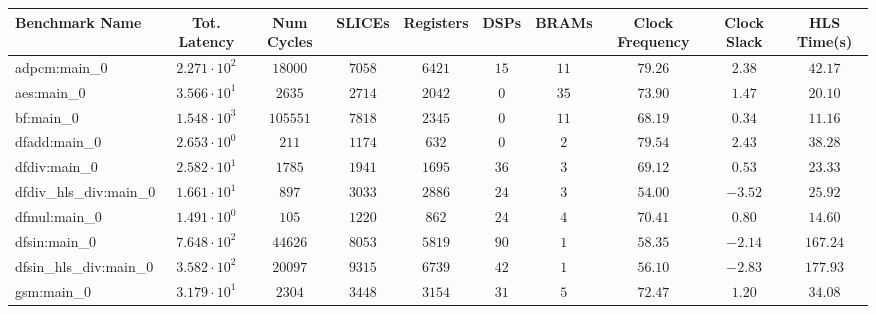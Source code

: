 \begin{tabular}{|l|c|c|c|c|c|c|c|c|c|}
\hline
Benchmark Name          & Tot. Latency           & Num Cycles & SLICEs    & Registers & DSPs    & BRAMs   & Clock Frequency & Clock Slack & HLS Time(s) \\
\hline
adpcm:main\_0           & $ 2.271 \cdot 10^{2} $ & $ 18000  $ & $ 7058  $ & $ 6421  $ & $ 15  $ & $ 11  $ & $ 79.26       $ & $ 2.38    $ & $ 42.17   $ \\
aes:main\_0             & $ 3.566 \cdot 10^{1} $ & $ 2635   $ & $ 2714  $ & $ 2042  $ & $ 0   $ & $ 35  $ & $ 73.90       $ & $ 1.47    $ & $ 20.10   $ \\
bf:main\_0              & $ 1.548 \cdot 10^{3} $ & $ 105551 $ & $ 7818  $ & $ 2345  $ & $ 0   $ & $ 11  $ & $ 68.19       $ & $ 0.34    $ & $ 11.16   $ \\
dfadd:main\_0           & $ 2.653 \cdot 10^{0} $ & $ 211    $ & $ 1174  $ & $ 632   $ & $ 0   $ & $ 2   $ & $ 79.54       $ & $ 2.43    $ & $ 38.28   $ \\
dfdiv:main\_0           & $ 2.582 \cdot 10^{1} $ & $ 1785   $ & $ 1941  $ & $ 1695  $ & $ 36  $ & $ 3   $ & $ 69.12       $ & $ 0.53    $ & $ 23.33   $ \\
dfdiv\_hls\_div:main\_0 & $ 1.661 \cdot 10^{1} $ & $ 897    $ & $ 3033  $ & $ 2886  $ & $ 24  $ & $ 3   $ & $ 54.00       $ & $ -3.52   $ & $ 25.92   $ \\
dfmul:main\_0           & $ 1.491 \cdot 10^{0} $ & $ 105    $ & $ 1220  $ & $ 862   $ & $ 24  $ & $ 4   $ & $ 70.41       $ & $ 0.80    $ & $ 14.60   $ \\
dfsin:main\_0           & $ 7.648 \cdot 10^{2} $ & $ 44626  $ & $ 8053  $ & $ 5819  $ & $ 90  $ & $ 1   $ & $ 58.35       $ & $ -2.14   $ & $ 167.24  $ \\
dfsin\_hls\_div:main\_0 & $ 3.582 \cdot 10^{2} $ & $ 20097  $ & $ 9315  $ & $ 6739  $ & $ 42  $ & $ 1   $ & $ 56.10       $ & $ -2.83   $ & $ 177.93  $ \\
gsm:main\_0             & $ 3.179 \cdot 10^{1} $ & $ 2304   $ & $ 3448  $ & $ 3154  $ & $ 31  $ & $ 5   $ & $ 72.47       $ & $ 1.20    $ & $ 34.08   $ \\

\end{tabular}

